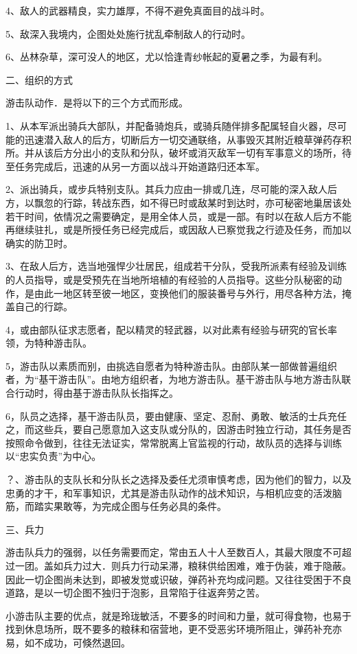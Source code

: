 4、敌人的武器精良，实力雄厚，不得不避免真面目的战斗时。

5、敌深入我境内，企图处处施行扰乱牵制敌人的行动时。

6、丛林杂草，深可没人的地区，尤以恰逢青纱帐起的夏暑之季，为最有利。

二、组织的方式

游击队动作．是将以下的三个方式而形成。

1、从本军派出骑兵大部队，并配备骑炮兵，或骑兵随伴排多配属轻自火器，尽可能的迅速潜入敌人的后方，切断后方一切交通联络，从事毁灭其附近粮草弹药存积所。并从该后方分出小的支队和分队，破坏或消灭敌军一切有军事意义的场所，待至任务完成后，迅速的从另一方面以战斗开始道路归还本军。

2、派出骑兵，或步兵特别支队。其兵力应由一排或几连，尽可能的深入敌人后方，以飘忽的行踪，转战东西，如不得已时或敌某时到达时，亦可秘密地巢居该处若干时间，依情况之需要确定，是用全体人员，或是一部。有时以在敌人后方不能再继续驻扎，或是所授任务已经完成后，或因敌人已察觉我之行迹及任务，而加以确实的防卫时。

3、在敌人后方，选当地强悍少壮居民，组成若干分队，受我所派素有经验及训练的人员指导，或是受预先在当地所培植的有经验的人员指导。这些分队秘密的动作，是由此一地区转至彼一地区，变换他们的服装番号与外行，用尽各种方法，掩盖自己的行踪。

4，或由部队征求志愿者，配以精灵的轻武器，以对此素有经验与研究的官长率领，为特种游击队。

5，游击队以素质而别，由挑选自愿者为特种游击队。由部队某一部做普遍组织者，为“基干游击队”。由地方组织者，为地方游击队。基干游击队与地方游击队联合行动时，得由基于游击队队长指挥之。

6，队员之选择，基干游击队员，要由健康、坚定、忍耐、勇敢、敏活的士兵充任之，而这些兵，要自己愿意加入这支队或分队的，因游击时独立行动，其任务是否按照命令做到，往往无法证实，常常脱离上官监视的行动，故队员的选择与训练以“忠实负责”为中心。

？、游击队的支队长和分队长之选择及委任尤须审慎考虑，因为他们的智力，以及忠勇的才干，和军事知识，尤其是游击队动作的战术知识，与相机应变的活泼脑筋，而踏实果敢等，为完成企图与任务必具的条件。

三、兵力

游击队兵力的强弱，以任务需要而定，常由五人十人至数百人，其最大限度不可超过一团。盖如兵力过大．则兵力行动呆滞，粮秣供给困难，难于伪装，难于隐蔽。因此一切企图尚未达到，即被发觉或识破，弹药补充均成问题。又往往受困于不良道路，是以一切企图不独归于泡影，且常陷于往返奔劳之苦。

小游击队主要的优点，就是玲珑敏活，不要多的时间和力量，就可得食物，也易于找到休息场所，既不要多的粮秣和宿营地，更不受恶劣环境所阻止，弹药补充亦易，如不成功，可倏然退回。

